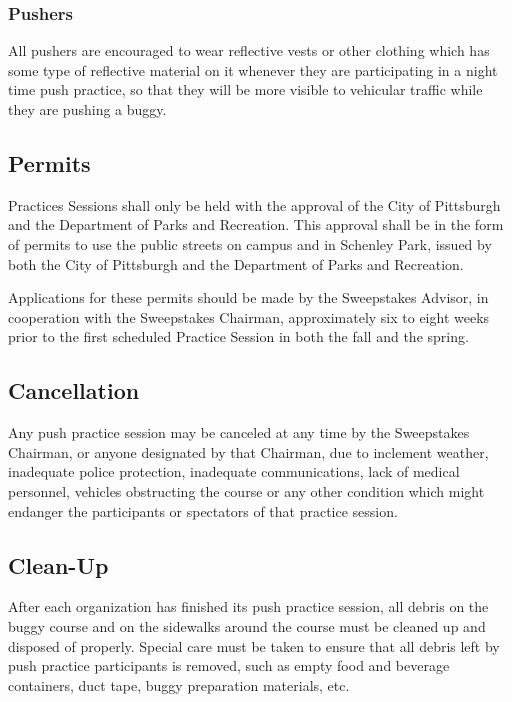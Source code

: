 \subsubsection{Pushers}

	All pushers are encouraged to wear reflective vests or other clothing which has
	some type of reflective material on it whenever they are participating in a
	night time push practice, so that they will be more visible to vehicular
	traffic while they are pushing a buggy.

\subsection{Permits}

	Practices Sessions shall only be held with the approval of the City of
	Pittsburgh and the Department of Parks and Recreation. This approval shall be
	in the form of permits to use the public streets on campus and in Schenley
	Park, issued by
	both the City of Pittsburgh and the Department of Parks and Recreation.

	Applications for these permits should be made by the Sweepstakes Advisor, in
	cooperation with the Sweepstakes Chairman, approximately six to eight weeks
	prior to the first scheduled Practice Session in both the fall and the spring.

\subsection{Cancellation}

	Any push practice session may be canceled at any time by the Sweepstakes
	Chairman, or anyone designated by that Chairman, due to inclement weather,
	inadequate police protection, inadequate communications, lack of medical
	personnel, vehicles obstructing the course or any other condition which might
	endanger the participants or spectators of that practice session.

\subsection{Clean-Up}

	After each organization has finished its push practice session, all debris on
	the buggy course and on the sidewalks around the course must be cleaned up and
	disposed of properly. Special care must be taken to ensure that all debris left
	by push practice participants is removed, such as empty food and beverage
	containers, duct tape, buggy preparation materials, etc.

